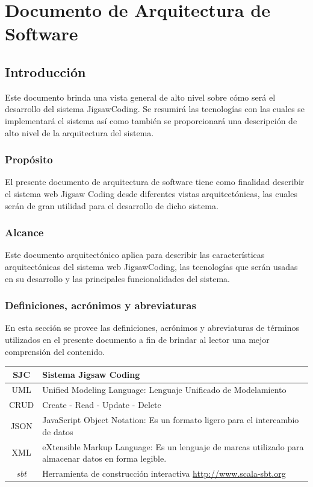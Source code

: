 \chapter{Documento de Arquitectura de Software}\label{apendice.C}
\section{Introducción}
Este documento brinda una vista general de alto nivel sobre cómo será el desarrollo del sistema JigsawCoding. Se resumirá las tecnologías con las cuales se implementará el sistema así como también se proporcionará una descripción de alto nivel de la arquitectura del sistema.
\subsection{Propósito}
El presente documento de arquitectura de software tiene como finalidad describir el sistema web Jigsaw Coding desde diferentes vistas arquitectónicas, las cuales serán de gran utilidad para el desarrollo de dicho sistema.
\subsection{Alcance} Este documento arquitectónico aplica para describir las características arquitectónicas del sistema web JigsawCoding, las tecnologías que serán usadas en su desarrollo y las principales funcionalidades del sistema.
\subsection{Definiciones, acrónimos y abreviaturas}
En esta sección se provee las definiciones, acrónimos y abreviaturas de términos utilizados en el presente documento a fin de brindar al lector una mejor comprensión del contenido. 
\clearpage
\begin{longtable}{c L{8cm}}
  \toprule[0.7mm]
  SJC & Sistema Jigsaw Coding \\ \midrule
  UML & Unified Modeling Language: Lenguaje Unificado de Modelamiento \\ \midrule
  CRUD & Create - Read - Update - Delete \\ \midrule
  JSON & JavaScript Object Notation: Es un formato ligero para el intercambio de datos \\ \midrule
  XML & eXtensible Markup Language: Es un lenguaje de marcas utilizado para almacenar datos en forma legible. \\ \midrule
  \emph{sbt} & Herramienta de construcción interactiva \url{http://www.scala-sbt.org} \\ \bottomrule[0.7mm]
\end{longtable}
